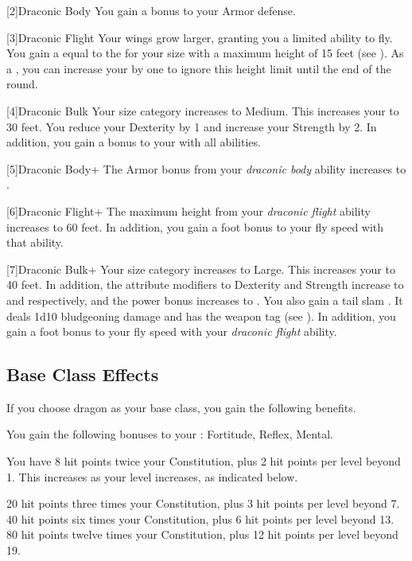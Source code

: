 [2]{Draconic Body} You gain a  bonus to your Armor defense.

[3]{Draconic Flight} Your wings grow larger, granting you a limited ability to fly.
You gain a  equal to the  for your size with a maximum height of 15 feet (see ).
As a , you can increase your  by one to ignore this height limit until the end of the round.

[4]{Draconic Bulk} Your size category increases to Medium.
This increases your  to 30 feet.
You reduce your Dexterity by 1 and increase your Strength by 2.
In addition, you gain a  bonus to your  with all abilities.

[5]{Draconic Body+} The Armor bonus from your \textit{draconic body} ability increases to .

[6]{Draconic Flight+} The maximum height from your \textit{draconic flight} ability increases to 60 feet.
In addition, you gain a  foot bonus to your fly speed with that ability.

[7]{Draconic Bulk+} Your size category increases to Large.
This increases your  to 40 feet.
In addition, the attribute modifiers to Dexterity and Strength increase to  and  respectively, and the power bonus increases to .
You also gain a tail slam .
It deals 1d10 bludgeoning damage and has the  weapon tag (see ).
In addition, you gain a  foot bonus to your fly speed with your \textit{draconic flight} ability.

\subsection{Base Class Effects}
If you choose dragon as your base class, you gain the following benefits.

You gain the following bonuses to your :  Fortitude,  Reflex,  Mental.

You have 8 hit points \add twice your Constitution, plus 2 hit points per level beyond 1.
This increases as your level increases, as indicated below.
\begin{itemize}
	 20 hit points \add three times your Constitution, plus 3 hit points per level beyond 7.
	 40 hit points \add six times your Constitution, plus 6 hit points per level beyond 13.
	 80 hit points \add twelve times your Constitution, plus 12 hit points per level beyond 19.
\end{itemize}

